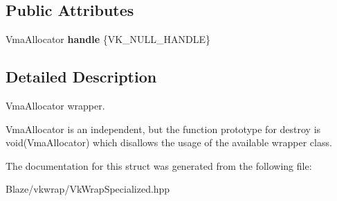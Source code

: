 \subsection*{Public Attributes}
\begin{DoxyCompactItemize}
\item 
\mbox{\label{structblaze_1_1vkw_1_1MemAllocator_a82c820fdffb5ab7b4c495215946ee337}} 
Vma\+Allocator {\bfseries handle} \{V\+K\+\_\+\+N\+U\+L\+L\+\_\+\+H\+A\+N\+D\+LE\}
\end{DoxyCompactItemize}


\subsection{Detailed Description}
Vma\+Allocator wrapper. 

Vma\+Allocator is an independent, but the function prototype for destroy is void(\+Vma\+Allocator) which disallows the usage of the available wrapper class. 

The documentation for this struct was generated from the following file\+:\begin{DoxyCompactItemize}
\item 
Blaze/vkwrap/Vk\+Wrap\+Specialized.\+hpp\end{DoxyCompactItemize}
